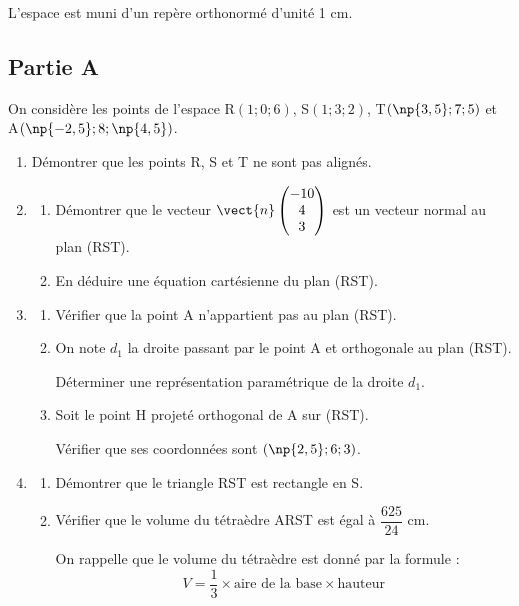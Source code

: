 L'espace est muni d'un repère orthonormé \Oijk{} d'unité 1 cm.

\subsection*{Partie A}

On considère les points de l'espace R$(1 ; 0 ; 6)$, S$(1 ; 3 ; 2)$, T$(\np{3,5} ; 7 ; 5)$ et A$(\np{-2,5} ; 8 ; \np{4,5})$.

\begin{enumerate}
	\item Démontrer que les points R, S et T ne sont pas alignés.

	\item \begin{enumerate}
		\item Démontrer que le vecteur $\vect{n} \begin{pmatrix}
			-10 \\ 4 \\ 3	\end{pmatrix}$ est un vecteur normal au plan (RST).

		\item En déduire une équation cartésienne du plan (RST).
	\end{enumerate}
	\item \begin{enumerate}
		\item Vérifier que la point A n'appartient pas au plan (RST).

		\item On note $d_1$ la droite passant par le point A et orthogonale au plan (RST).

		Déterminer une représentation paramétrique de la droite $d_1$.

		\item Soit le point H projeté orthogonal de A sur (RST).

		Vérifier que ses coordonnées sont $(\np{2,5} ; 6 ; 3)$.
	\end{enumerate}

	\item \begin{enumerate}
		\item Démontrer que le triangle RST est rectangle en S.

		\item Vérifier que le volume du tétraèdre ARST est égal à $\dfrac{625}{24}$ cm.

		On rappelle que le volume du tétraèdre est donné par la formule :
		\[ V= \frac{1}{3} \times \text{aire de la base} \times \text{hauteur}\]
	\end{enumerate}
\end{enumerate}

